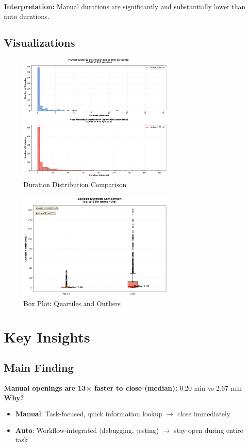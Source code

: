 \documentclass[11pt,a4paper]{article}
\begin{document}
\textbf{Interpretation:} Manual durations are significantly and substantially lower than auto durations.

\subsection{Visualizations}

\begin{figure}[H]
    \centering
    \includegraphics[width=0.7\textwidth]{plots/histogram.png}
    \caption{Duration Distribution Comparison}
\end{figure}

\begin{figure}[H]
    \centering
    \includegraphics[width=0.7\textwidth]{plots/boxplot.png}
    \caption{Box Plot: Quartiles and Outliers}
\end{figure}
\newpage
\section{Key Insights}

\subsection{Main Finding}
\textbf{Manual openings are 13× faster to close (median):} 0.20 min vs 2.67 min
\\
\textbf{Why?}
\begin{itemize}
    \item \textbf{Manual}: Task-focused, quick information lookup $\rightarrow$ close immediately
    \item \textbf{Auto}: Workflow-integrated (debugging, testing) $\rightarrow$ stay open during entire task
\end{itemize}
\end{document}
